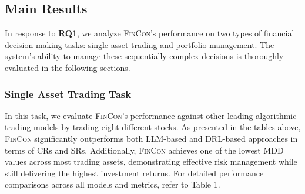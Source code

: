 
\subsection{Main Results}
In response to \textbf{RQ1}, we analyze \textsc{FinCon}'s performance on two types of financial decision-making tasks: single-asset trading and portfolio management. The system's ability to manage these sequentially complex decisions is thoroughly evaluated in the following sections.

\subsubsection{Single Asset Trading Task}
In this task, we evaluate \textsc{FinCon}’s performance against other leading algorithmic trading models by trading eight different stocks. As presented in the tables above, \textsc{FinCon} significantly outperforms both LLM-based and DRL-based approaches in terms of CRs and SRs. Additionally, \textsc{FinCon} achieves one of the lowest MDD values across most trading assets, demonstrating effective risk management while still delivering the highest investment returns. For detailed performance comparisons across all models and metrics, refer to Table 1.

